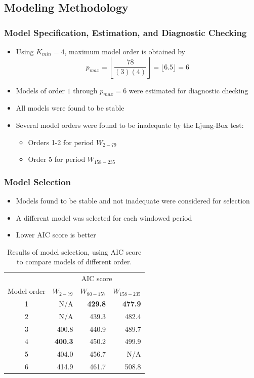 \documentclass[presentation]{beamer}
\begin{document}
\subsection{Modeling Methodology}

\begin{frame}[t]
\frametitle{Model Specification, Estimation, and Diagnostic Checking}
\begin{itemize}
\item{Using $K_{min} = 4$, maximum model order is obtained by
\begin{equation}
p_{max} = \left \lfloor \frac{78}{(3)(4)} \right \rfloor = \lfloor 6.5 \rfloor = 6
\end{equation}
}
\item{Models of order $1$ through $p_{max}=6$ were estimated for diagnostic checking}
\item{All models were found to be stable}
\item{Several model orders were found to be inadequate by the Ljung-Box test:
  \begin{itemize}
  \item{Orders 1-2 for period $W_{2-79}$}
  \item{Order 5 for period $W_{158-235}$}
  \end{itemize}
}
\end{itemize}
\end{frame}

\begin{frame}[t]
\frametitle{Model Selection}
\begin{itemize}
\item{Models found to be stable and not inadequate were considered for selection}
\item{A different model was selected for each windowed period}
\item{Lower AIC score is better}
\end{itemize}
\footnotesize{
\begin{table}[htbp]
  \centering
  \begin{tabular}{ c | r | r | r }
    ~ & \multicolumn{3}{|c}{AIC score} \\
    Model order & $W_{2-79}$ & $W_{80-157}$ & $W_{158-235}$ \\
    \hline
    1 & N/A & \textbf{429.8} & \textbf{477.9} \\
    2 & N/A & 439.3 & 482.4 \\
    3 & 400.8 & 440.9 & 489.7 \\
    4 & \textbf{400.3} & 450.2 & 499.9 \\ 
    5 & 404.0 & 456.7 & N/A \\
    6 & 414.9 & 461.7 & 508.8 \\
    \hline
  \end{tabular}
\caption{Results of model selection, using AIC score to compare models of different order.}
\end{table}
}
\end{frame}
\end{document}
